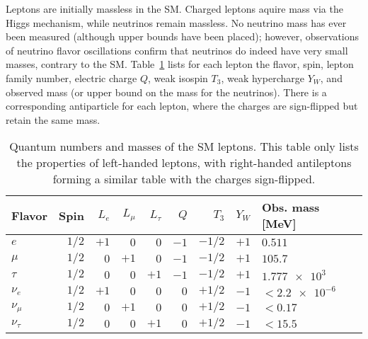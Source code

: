 Leptons are initially massless in the SM. Charged leptons aquire mass via the Higgs mechanism, while neutrinos remain massless. No neutrino mass has ever been measured (although upper bounds have been placed); however, observations of neutrino flavor oscillations confirm that neutrinos do indeed have very small masses, contrary to the SM. Table~\ref{tab:Leptons} lists for each lepton the flavor, spin, lepton family number, electric charge $Q$, weak isospin $T_3$, weak hypercharge $Y_W$, and observed mass (or upper bound on the mass for the neutrinos). There is a corresponding antiparticle for each lepton, where the charges are sign-flipped but retain the same mass.
\begin{table}[H]
    \begin{center}
        \caption{Quantum numbers and masses of the SM leptons. This table only lists the properties of left-handed leptons, with right-handed antileptons forming a similar table with the charges sign-flipped.}
        \begin{tabular}{lrrrrrrrl}
            \hline \hline
            Flavor          & Spin  & $L_e$ & $L_{\mu}$ & $L_{\tau}$    & $Q$   & $T_3$     & $Y_W$ & Obs. mass [MeV] \\ \hline
            $e$             & $1/2$ & $+1$   & $0$       & $0$           & $-1$   & $-1/2$    & $+1$  & \;\;\;\;$\num{0.511}$ \\
            $\mu$           & $1/2$ & $0$   & $+1$       & $0$           & $-1$   & $-1/2$    & $+1$  & \;\;\;\;$\num{105.7}$ \\
            $\tau$          & $1/2$ & $0$   & $0$       & $+1$           & $-1$   & $-1/2$    & $+1$  & \;\;\;\;$\num{1.777e3}$ \\
            $\nu_e$         & $1/2$ & $+1$   & $0$       & $0$           & $0$   & $+1/2$    & $-1$  & $<\num{2.2e-6}$ \\
            $\nu_{\mu}$     & $1/2$ & $0$   & $+1$       & $0$           & $0$   & $+1/2$    & $-1$  & $<\num{0.17}$ \\
            $\nu_{\tau}$    & $1/2$ & $0$   & $0$       & $+1$           & $0$   & $+1/2$    & $-1$  & $<\num{15.5}$ \\ \hline \hline
        \end{tabular}
        \label{tab:Leptons}
    \end{center}
\end{table}




